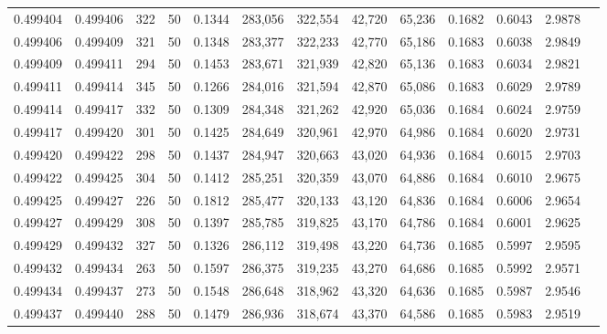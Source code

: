 \begin{tabular}{rrrrrrrrrrrrr}
0.499404 & 0.499406 & 322 &  50 &                                     0.1344 & 283,056 & 322,554 &  42,720 &  65,236 & 0.1682 & 0.6043 & 2.9878 \\
0.499406 & 0.499409 & 321 &  50 &                                     0.1348 & 283,377 & 322,233 &  42,770 &  65,186 & 0.1683 & 0.6038 & 2.9849 \\
0.499409 & 0.499411 & 294 &  50 &                                     0.1453 & 283,671 & 321,939 &  42,820 &  65,136 & 0.1683 & 0.6034 & 2.9821 \\
0.499411 & 0.499414 & 345 &  50 &                                     0.1266 & 284,016 & 321,594 &  42,870 &  65,086 & 0.1683 & 0.6029 & 2.9789 \\
0.499414 & 0.499417 & 332 &  50 &                                     0.1309 & 284,348 & 321,262 &  42,920 &  65,036 & 0.1684 & 0.6024 & 2.9759 \\
0.499417 & 0.499420 & 301 &  50 &                                     0.1425 & 284,649 & 320,961 &  42,970 &  64,986 & 0.1684 & 0.6020 & 2.9731 \\
0.499420 & 0.499422 & 298 &  50 &                                     0.1437 & 284,947 & 320,663 &  43,020 &  64,936 & 0.1684 & 0.6015 & 2.9703 \\
0.499422 & 0.499425 & 304 &  50 &                                     0.1412 & 285,251 & 320,359 &  43,070 &  64,886 & 0.1684 & 0.6010 & 2.9675 \\
0.499425 & 0.499427 & 226 &  50 &                                     0.1812 & 285,477 & 320,133 &  43,120 &  64,836 & 0.1684 & 0.6006 & 2.9654 \\
0.499427 & 0.499429 & 308 &  50 &                                     0.1397 & 285,785 & 319,825 &  43,170 &  64,786 & 0.1684 & 0.6001 & 2.9625 \\
0.499429 & 0.499432 & 327 &  50 &                                     0.1326 & 286,112 & 319,498 &  43,220 &  64,736 & 0.1685 & 0.5997 & 2.9595 \\
0.499432 & 0.499434 & 263 &  50 &                                     0.1597 & 286,375 & 319,235 &  43,270 &  64,686 & 0.1685 & 0.5992 & 2.9571 \\
0.499434 & 0.499437 & 273 &  50 &                                     0.1548 & 286,648 & 318,962 &  43,320 &  64,636 & 0.1685 & 0.5987 & 2.9546 \\
0.499437 & 0.499440 & 288 &  50 &                                     0.1479 & 286,936 & 318,674 &  43,370 &  64,586 & 0.1685 & 0.5983 & 2.9519 \\

\end{tabular}
